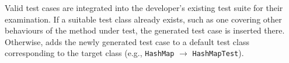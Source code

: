 Valid test cases are integrated into the developer's existing test suite for their examination.
If a suitable test class already exists, such as one covering other behaviours of the method under test, the generated test case is inserted there. 
Otherwise, \toolname adds the newly generated test case to a default test class corresponding to the target class (e.g., \texttt{HashMap} $\rightarrow$ \texttt{HashMapTest}).